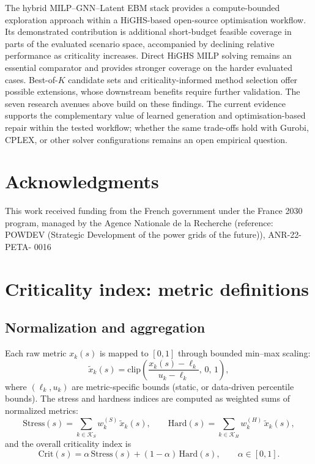 \documentclass{article}
\begin{document}
The hybrid MILP--GNN--Latent EBM stack provides a compute-bounded exploration approach within a HiGHS-based open-source optimisation workflow. Its demonstrated contribution is additional short-budget feasible coverage in parts of the evaluated scenario space, accompanied by declining relative performance as criticality increases. Direct HiGHS MILP solving remains an essential comparator and provides stronger coverage on the harder evaluated cases. Best-of-$K$ candidate sets and criticality-informed method selection offer possible extensions, whose downstream benefits require further validation. The seven research avenues above build on these findings. The current evidence supports the complementary value of learned generation and optimisation-based repair within the tested workflow; whether the same trade-offs hold with Gurobi, CPLEX, or other solver configurations remains an open empirical question.


\section*{Acknowledgments}

This work received funding from the French
government under the France 2030 program, managed by the Agence Nationale de la Recherche (reference: POWDEV (Strategic Development of the power grids of the future)), ANR-22-PETA- 0016

  
       


\appendix
\section{Criticality index: metric definitions}
\label{app:criticality}

\subsection{Normalization and aggregation}
Each raw metric $x_k(s)$ is mapped to $[0,1]$ through bounded min--max scaling:
\begin{equation}
\tilde{x}_k(s)=\mathrm{clip}\!\left(\frac{x_k(s)-\ell_k}{u_k-\ell_k},\,0,\,1\right),
\label{eq:crit_norm}
\end{equation}
where $(\ell_k,u_k)$ are metric-specific bounds (static, or data-driven percentile bounds).
The stress and hardness indices are computed as weighted sums of normalized metrics:
\begin{equation}
\mathrm{Stress}(s)=\sum_{k\in\mathcal{K}_S} w_k^{(S)}\,\tilde{x}_k(s),\qquad
\mathrm{Hard}(s)=\sum_{k\in\mathcal{K}_H} w_k^{(H)}\,\tilde{x}_k(s),
\end{equation}
and the overall criticality index is
\begin{equation}
\mathrm{Crit}(s)=\alpha\,\mathrm{Stress}(s)+(1-\alpha)\,\mathrm{Hard}(s),\qquad \alpha\in[0,1].
\end{equation}
\end{document}
